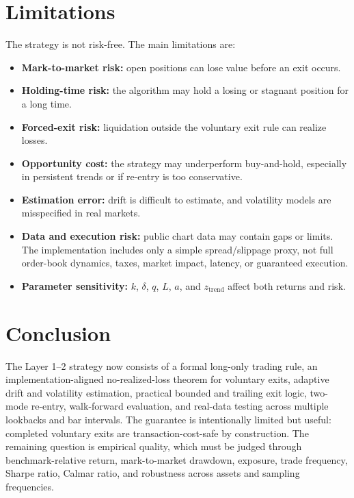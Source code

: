 \documentclass[11pt]{article}
\begin{document}
\section{Limitations}

The strategy is not risk-free. The main limitations are:
\begin{itemize}
    \item \textbf{Mark-to-market risk:} open positions can lose value before an exit occurs.
    \item \textbf{Holding-time risk:} the algorithm may hold a losing or stagnant position for a long time.
    \item \textbf{Forced-exit risk:} liquidation outside the voluntary exit rule can realize losses.
    \item \textbf{Opportunity cost:} the strategy may underperform buy-and-hold, especially in persistent trends or if re-entry is too conservative.
    \item \textbf{Estimation error:} drift is difficult to estimate, and volatility models are misspecified in real markets.
    \item \textbf{Data and execution risk:} public chart data may contain gaps or limits. The implementation includes only a simple spread/slippage proxy, not full order-book dynamics, taxes, market impact, latency, or guaranteed execution.
    \item \textbf{Parameter sensitivity:} \(k\), \(\delta\), \(q\), \(L\), \(a\), and \(z_{\mathrm{trend}}\) affect both returns and risk.
\end{itemize}

\section{Conclusion}

The Layer 1--2 strategy now consists of a formal long-only trading rule, an implementation-aligned no-realized-loss theorem for voluntary exits, adaptive drift and volatility estimation, practical bounded and trailing exit logic, two-mode re-entry, walk-forward evaluation, and real-data testing across multiple lookbacks and bar intervals. The guarantee is intentionally limited but useful: completed voluntary exits are transaction-cost-safe by construction. The remaining question is empirical quality, which must be judged through benchmark-relative return, mark-to-market drawdown, exposure, trade frequency, Sharpe ratio, Calmar ratio, and robustness across assets and sampling frequencies.
\end{document}
